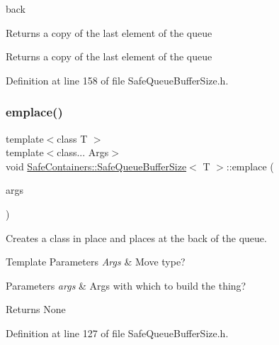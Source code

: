 back 

Returns a copy of the last element of the queue

\begin{DoxyReturn}{Returns}
a copy of the last element of the queue 
\end{DoxyReturn}


Definition at line 158 of file Safe\+Queue\+Buffer\+Size.\+h.

\mbox{\label{classSafeContainers_1_1SafeQueueBufferSize_ad96ffce7d2637737515882c3da0274ee}} 
\subsubsection{\texorpdfstring{emplace()}{emplace()}}
{\footnotesize\ttfamily template$<$class T $>$ \\
template$<$class... Args$>$ \\
void \mbox{\hyperlink{classSafeContainers_1_1SafeQueueBufferSize}{Safe\+Containers\+::\+Safe\+Queue\+Buffer\+Size}}$<$ T $>$\+::emplace (\begin{DoxyParamCaption}\item[{Args \&\&...}]{args }\end{DoxyParamCaption})\hspace{0.3cm}{\ttfamily [inline]}}



Creates a class in place and places at the back of the queue. 


\begin{DoxyTemplParams}{Template Parameters}
{\em Args} & Move type? \\
\hline
\end{DoxyTemplParams}

\begin{DoxyParams}{Parameters}
{\em args} & Args with which to build the thing? \\
\hline
\end{DoxyParams}
\begin{DoxyReturn}{Returns}
None 
\end{DoxyReturn}


Definition at line 127 of file Safe\+Queue\+Buffer\+Size.\+h.

